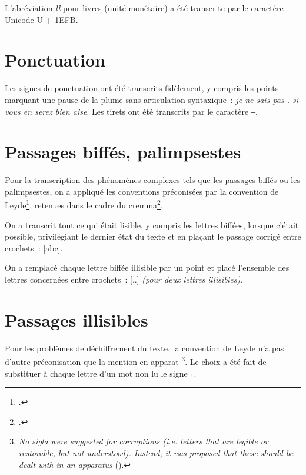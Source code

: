 \documentclass[a4paper,12pt,twoside]{book}
\newcommand{\langue}[1]{\emph{#1}}
\begin{document}
			L'abréviation \textit{ll} pour livres (unité monétaire) a été transcrite par le caractère Unicode \href{https://mufi.info/m.php?p=muficharinfo&i=4088}{U + 1EFB}.

		\section{Ponctuation}
			Les signes de ponctuation ont été transcrits fidèlement, y compris les points marquant une pause de la plume sans articulation syntaxique~: \textit{je ne sais pas . si vous en serez bien aise}. Les tirets ont été transcrits par le caractère ‒.
		
		\section{Passages biffés, palimpsestes}
			\label{biffes}
			Pour la transcription des phénomènes complexes tels que les passages biffés ou les palimpsestes, on a appliqué les conventions préconisées par la convention de Leyde\footcite{leidenConvention}, retenues dans le cadre du \gls{cremma}\footcite{pincheSeminaireCreationModele2021a}.
			
			On a transcrit tout ce qui était lisible, y compris les lettres biffées, lorsque c'était possible, privilégiant le dernier état du texte et en plaçant le passage corrigé entre crochets~: [abc].
		
			On a remplacé chaque lettre biffée illisible par un point et placé l'ensemble des lettres concernées entre crochets~: [..] \textit{(pour deux lettres illisibles)}.
		
		\section{Passages illisibles}
			Pour les problèmes de déchiffrement du texte, la convention de Leyde n'a pas d'autre préconisation que la mention en apparat
			\footnote{\langue{No sigla were suggested for corruptions (i.e. letters that are legible or restorable, but not understood). Instead, it was proposed that these should be dealt with in an apparatus} (\cite{leidenConvention}).}.
			Le choix a été fait de substituer à chaque lettre d'un mot non lu le signe †.

	\pagestyle{empty}				
	\cleardoublepage
	\pagestyle{plain}					
      	
	\printglossaries

	\pagestyle{empty}				
	\cleardoublepage
	\pagestyle{plain}					
	
\end{document}

